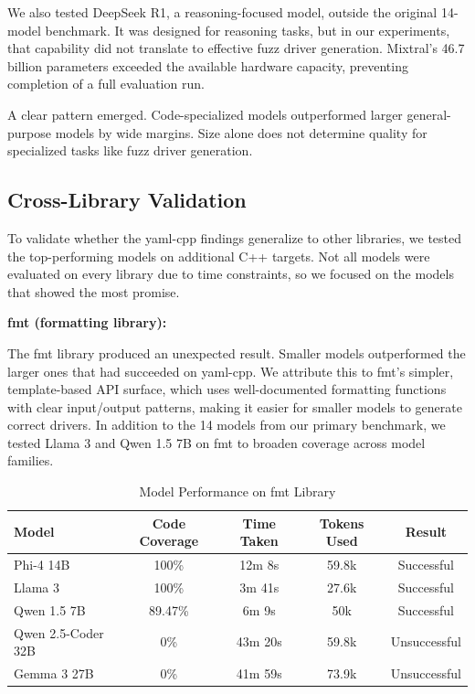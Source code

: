 We also tested DeepSeek R1, a reasoning-focused model, outside the original 14-model benchmark. It was designed for reasoning tasks, but in our experiments, that capability did not translate to effective fuzz driver generation. Mixtral's 46.7 billion parameters exceeded the available hardware capacity, preventing completion of a full evaluation run.

A clear pattern emerged. Code-specialized models outperformed larger general-purpose models by wide margins. Size alone does not determine quality for specialized tasks like fuzz driver generation.


\subsection{Cross-Library Validation}
\label{sec:results_cross_library}

To validate whether the yaml-cpp findings generalize to other libraries, we tested the top-performing models on additional C++ targets. Not all models were evaluated on every library due to time constraints, so we focused on the models that showed the most promise.

\textbf{fmt (formatting library):}

The fmt library produced an unexpected result. Smaller models outperformed the larger ones that had succeeded on yaml-cpp. We attribute this to fmt's simpler, template-based API surface, which uses well-documented formatting functions with clear input/output patterns, making it easier for smaller models to generate correct drivers. In addition to the 14 models from our primary benchmark, we tested Llama 3 and Qwen 1.5 7B on fmt to broaden coverage across model families.

\begin{table}[htbp]
\centering
\caption{Model Performance on fmt Library}
\label{tab:fmt_results}
\small
\begin{tabular}{lcccc}
\toprule
Model & Code Coverage & Time Taken & Tokens Used & Result \\
\midrule
Phi-4 14B & 100\% & 12m 8s & 59.8k & Successful \\
Llama 3 & 100\% & 3m 41s & 27.6k & Successful \\
Qwen 1.5 7B & 89.47\% & 6m 9s & 50k & Successful \\
Qwen 2.5-Coder 32B & 0\% & 43m 20s & 59.8k & Unsuccessful \\
Gemma 3 27B & 0\% & 41m 59s & 73.9k & Unsuccessful \\
\bottomrule
\end{tabular}
\end{table}

